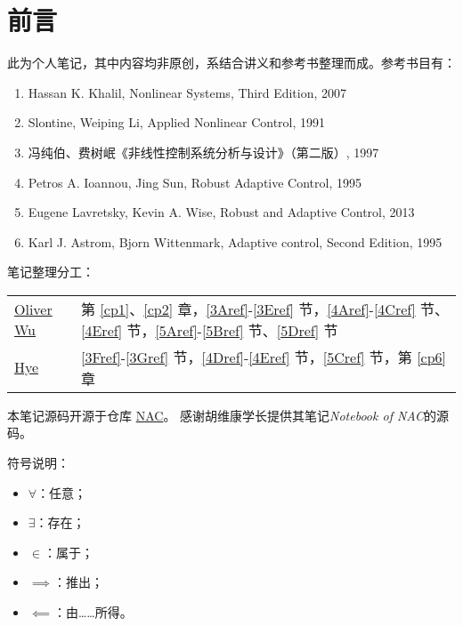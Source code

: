 \chapter*{前言}
此为个人笔记，其中内容均非原创，系结合讲义和参考书整理而成。参考书目有：
\begin{enumerate}
    \item Hassan K. Khalil, Nonlinear Systems, Third Edition, 2007
    \item Slontine, Weiping Li, Applied   Nonlinear    Control, 1991
    \item 冯纯伯、费树岷《非线性控制系统分析与设计》（第二版）, 1997
    \item Petros A. Ioannou, Jing Sun, Robust Adaptive Control, 1995
    \item Eugene Lavretsky, Kevin A. Wise, Robust and Adaptive Control, 2013
    \item Karl J. Astrom, Bjorn Wittenmark, Adaptive control, Second Edition, 1995
\end{enumerate}

笔记整理分工：
\begin{table*}[htbp]
  \centering
  \setcellgapes{4pt}
  \makegapedcells
  \begin{tabular}{p{2.0cm}p{10.0cm}}
    \hline
    \href{https://github.com/OliverWu515}{Oliver Wu} & 第 \ref{cp1}、\ref{cp2} 章，\ref{3Aref}-\ref{3Eref} 节，\ref{4Aref}-\ref{4Cref} 节、\ref{4Eref} 节，\ref{5Aref}-\ref{5Bref} 节、\ref{5Dref} 节\\
    \href{https://github.com/Co-ding-Man}{Hye} & \ref{3Fref}-\ref{3Gref} 节，\ref{4Dref}-\ref{4Eref} 节，\ref{5Cref} 节，第 \ref{cp6} 章\\
    \hline
  \end{tabular}
\end{table*}

本笔记源码开源于仓库 \href{https://github.com/OliverWu515/NAC}{NAC}。
感谢胡维康学长提供其笔记{\it Notebook of NAC}的源码。

符号说明：
\begin{itemize}
    \item $\forall$：任意；
    \item $\exists$：存在；
    \item $\in$：属于；
    \item $\implies$：推出；
    \item $\impliedby$：由……所得。
\end{itemize}